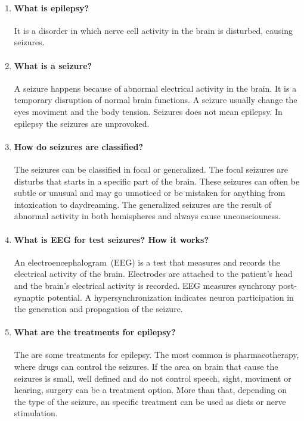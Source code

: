 \documentclass[12pt,article,oneside,a4paper]{memoir}
\begin{document}
\begin{enumerate}
\item \paragraph{What is epilepsy?}
It is a disorder in which nerve cell activity in the brain is disturbed,
causing seizures.

\item \paragraph{What is a seizure?}
A seizure happens because of abnormal electrical activity in the brain. It is a
temporary disruption of normal brain functions. A seizure usually change the
eyes moviment and the body tension.
Seizures does not mean epilepsy. In epilepsy the seizures are unprovoked.

\item \paragraph{How do seizures are classified?}
The seizures can be classified in focal or generalized.
The focal seizures are disturbs that starts in a specific part of the brain.
These seizures can often be subtle or unusual and may go unnoticed or be
mistaken for anything from intoxication to daydreaming.
The generalized seizures are the result of abnormal activity in both
hemispheres and always cause unconsciouness.

\item \paragraph{What is EEG for test seizures? How it works?}
An electroencephalogram~(EEG) is a test that measures and records the
electrical activity of the brain. Electrodes are attached to the patient's
head and the brain's electrical activity is recorded. EEG measures synchrony
post-synaptic potential. A hypersynchronization indicates neuron participation
in the generation and propagation of the seizure.

\item \paragraph{What are the treatments for epilepsy?}
The are some treatments for epilepsy. The most common is pharmacotherapy, where
drugs can control the seizures. If the area on brain that cause the seizures is
small, well defined and do not control speech, sight, moviment or hearing,
surgery can be a treatment option. More than that, depending on the type of the
seizure, an specific treatment can be used as diets or nerve stimulation.

\end{enumerate}
\end{document}
